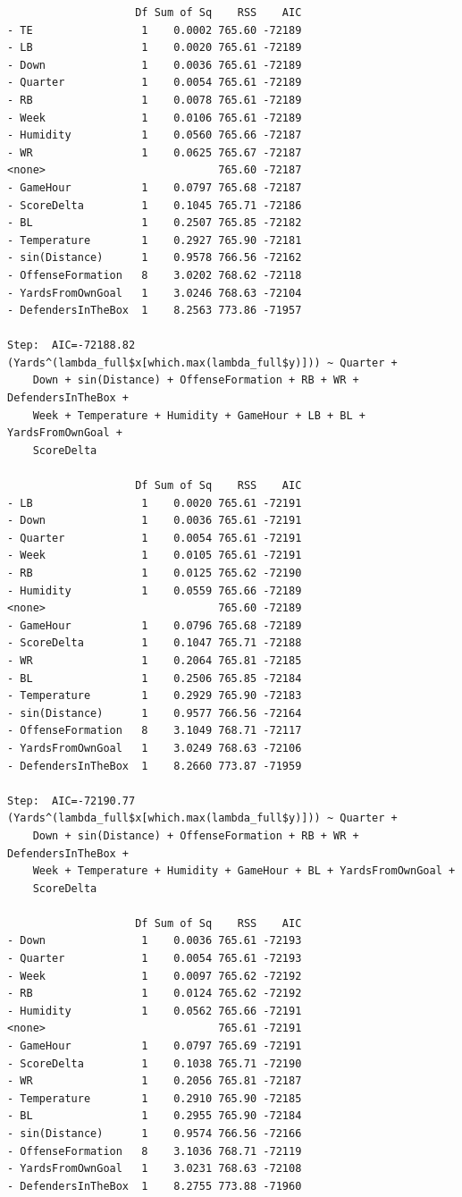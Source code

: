 \documentclass[
  super,
  preprint,
  3p]{elsarticle}
\begin{document}
\begin{verbatim}
                    Df Sum of Sq    RSS    AIC
- TE                 1    0.0002 765.60 -72189
- LB                 1    0.0020 765.61 -72189
- Down               1    0.0036 765.61 -72189
- Quarter            1    0.0054 765.61 -72189
- RB                 1    0.0078 765.61 -72189
- Week               1    0.0106 765.61 -72189
- Humidity           1    0.0560 765.66 -72187
- WR                 1    0.0625 765.67 -72187
<none>                           765.60 -72187
- GameHour           1    0.0797 765.68 -72187
- ScoreDelta         1    0.1045 765.71 -72186
- BL                 1    0.2507 765.85 -72182
- Temperature        1    0.2927 765.90 -72181
- sin(Distance)      1    0.9578 766.56 -72162
- OffenseFormation   8    3.0202 768.62 -72118
- YardsFromOwnGoal   1    3.0246 768.63 -72104
- DefendersInTheBox  1    8.2563 773.86 -71957

Step:  AIC=-72188.82
(Yards^(lambda_full$x[which.max(lambda_full$y)])) ~ Quarter + 
    Down + sin(Distance) + OffenseFormation + RB + WR + DefendersInTheBox + 
    Week + Temperature + Humidity + GameHour + LB + BL + YardsFromOwnGoal + 
    ScoreDelta

                    Df Sum of Sq    RSS    AIC
- LB                 1    0.0020 765.61 -72191
- Down               1    0.0036 765.61 -72191
- Quarter            1    0.0054 765.61 -72191
- Week               1    0.0105 765.61 -72191
- RB                 1    0.0125 765.62 -72190
- Humidity           1    0.0559 765.66 -72189
<none>                           765.60 -72189
- GameHour           1    0.0796 765.68 -72189
- ScoreDelta         1    0.1047 765.71 -72188
- WR                 1    0.2064 765.81 -72185
- BL                 1    0.2506 765.85 -72184
- Temperature        1    0.2929 765.90 -72183
- sin(Distance)      1    0.9577 766.56 -72164
- OffenseFormation   8    3.1049 768.71 -72117
- YardsFromOwnGoal   1    3.0249 768.63 -72106
- DefendersInTheBox  1    8.2660 773.87 -71959

Step:  AIC=-72190.77
(Yards^(lambda_full$x[which.max(lambda_full$y)])) ~ Quarter + 
    Down + sin(Distance) + OffenseFormation + RB + WR + DefendersInTheBox + 
    Week + Temperature + Humidity + GameHour + BL + YardsFromOwnGoal + 
    ScoreDelta

                    Df Sum of Sq    RSS    AIC
- Down               1    0.0036 765.61 -72193
- Quarter            1    0.0054 765.61 -72193
- Week               1    0.0097 765.62 -72192
- RB                 1    0.0124 765.62 -72192
- Humidity           1    0.0562 765.66 -72191
<none>                           765.61 -72191
- GameHour           1    0.0797 765.69 -72191
- ScoreDelta         1    0.1038 765.71 -72190
- WR                 1    0.2056 765.81 -72187
- Temperature        1    0.2910 765.90 -72185
- BL                 1    0.2955 765.90 -72184
- sin(Distance)      1    0.9574 766.56 -72166
- OffenseFormation   8    3.1036 768.71 -72119
- YardsFromOwnGoal   1    3.0231 768.63 -72108
- DefendersInTheBox  1    8.2755 773.88 -71960


\end{verbatim}
\end{document}
